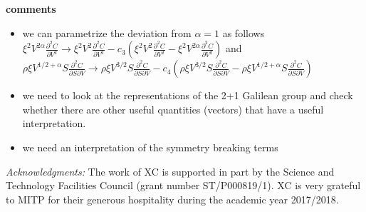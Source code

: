 \documentclass[english,12pt]{article}
\def\to{\rightarrow}
\begin{document}
{\bf comments}

\begin{itemize}
\item we can parametrize the deviation from $\alpha=1$ as follows
$\xi^2 V^{2 \alpha}  \frac{\partial^2 C}{\partial V^2}\to\xi^2 V^{2}  \frac{\partial^2 C}{\partial V^2}- c_3 (\xi^2 V^{2}  \frac{\partial^2 C}{\partial V^2}-\xi^2 V^{2 \alpha}  \frac{\partial^2 C}{\partial V^2}) $ and $\rho \xi V^{1/2+\alpha} S \frac{\partial^2 C}{\partial S \partial V}\to \rho \xi V^{3/2} S \frac{\partial^2 C}{\partial S \partial V} 
- c_4(\rho \xi V^{3/2} S \frac{\partial^2 C}{\partial S \partial V} -
\rho \xi V^{1/2+\alpha} S \frac{\partial^2 C}{\partial S \partial V}) $ 
\item we need to look at the representations of the 2+1 Galilean group and check whether there are other useful quantities (vectors) that have a useful interpretation.
\item we need an interpretation of the symmetry breaking terms
\end{itemize}












{\it Acknowledgments:}
The work of XC is supported in part  by the Science and Technology Facilities Council (grant number  ST/P000819/1). XC is very grateful to MITP for their generous hospitality during the academic year 2017/2018. 



\bigskip{}


\baselineskip=1.6pt 

\begin{thebibliography}{10}

   
\end{thebibliography}
\end{document}
